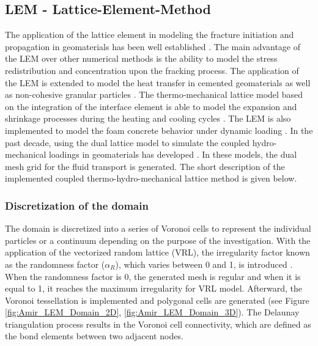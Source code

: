 \subsection{LEM - Lattice-Element-Method}


The application of the lattice element in modeling the fracture initiation and propagation in geomaterials has been well established \cite{Liuetal2007, Pradoetal2003, vanMieretal2002}. The main advantage of the LEM over other numerical methods is the ability to model the stress redistribution and concentration upon the fracking process. The application of the LEM is extended to model the heat transfer in cemented geomaterials \cite{Sattarietal2017} as well as non-cohesive granular particles \cite{Rizvietal2018b}. The thermo-mechanical lattice model based on the integration of the interface element is able to model the expansion and shrinkage processes during the heating and cooling cycles \cite{Sattarietal2019b}. The LEM is also implemented to model the foam concrete behavior under dynamic loading \cite{Rizvietal2018a}. In the past decade, using the dual lattice model to simulate the coupled hydro-mechanical loadings in geomaterials has developed \cite{Grassl2009}. In these models, the dual mesh grid for the fluid transport is generated. The short description of the implemented coupled thermo-hydro-mechanical lattice method is given below.

\subsubsection*{Discretization of the domain}
\label{Section:DiscretizationLattice}

The domain is discretized into a series of Voronoi cells to represent the individual particles or a continuum depending on the purpose of the investigation. With the application of the vectorized random lattice (VRL), the irregularity factor known as the randomness factor ($\alpha_{R}$), which varies between 0 and 1, is introduced \cite{Moukarzeletal1992}. When the randomness factor is 0, the generated mesh is regular and when it is equal to 1, it reaches the maximum irregularity for VRL model. Afterward, the Voronoi tessellation is implemented and polygonal cells are generated (see Figure \ref{fig:Amir_LEM_Domain_2D}, \ref{fig:Amir_LEM_Domain_3D}). The Delaunay triangulation process results in the Voronoi cell connectivity, which are defined as the bond elements between two adjacent nodes. 

